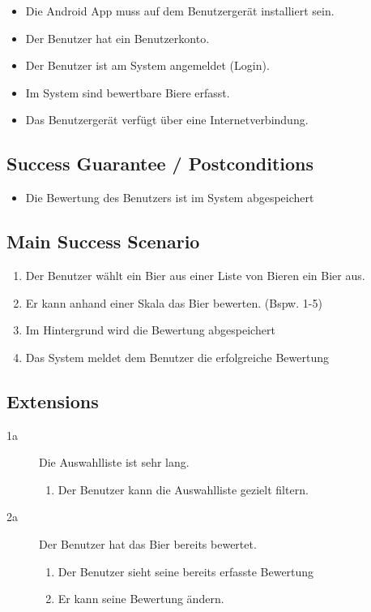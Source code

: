 \documentclass[10pt,a4paper]{scrartcl}
\begin{document}
\begin{itemize}
\item Die Android App muss auf dem Benutzergerät installiert sein.
\item Der Benutzer hat ein Benutzerkonto.
\item Der Benutzer ist am System angemeldet (Login).
\item Im System sind bewertbare Biere erfasst.
\item Das Benutzergerät verfügt über eine Internetverbindung.
\end{itemize}


\subsection*{Success Guarantee / Postconditions}
\begin{itemize}
\item Die Bewertung des Benutzers ist im System abgespeichert
\end{itemize}


\subsection*{Main Success Scenario}

\begin{enumerate}
\item Der Benutzer wählt ein Bier aus einer Liste von Bieren ein Bier aus.
\item Er kann anhand einer Skala das Bier bewerten. (Bspw. 1-5)
\item Im Hintergrund wird die Bewertung abgespeichert
\item Das System meldet dem Benutzer die erfolgreiche Bewertung
\end{enumerate}


\subsection*{Extensions}

\begin{description}
\item[1a] Die Auswahlliste ist sehr lang.
	\begin{enumerate}
	\item Der Benutzer kann die Auswahlliste gezielt filtern.
	\end{enumerate}
\item[2a] Der Benutzer hat das Bier bereits bewertet.
	\begin{enumerate}
	\item Der Benutzer sieht seine bereits erfasste Bewertung
	\item Er kann seine Bewertung ändern.
	\end{enumerate}

\end{description}
\end{document}
